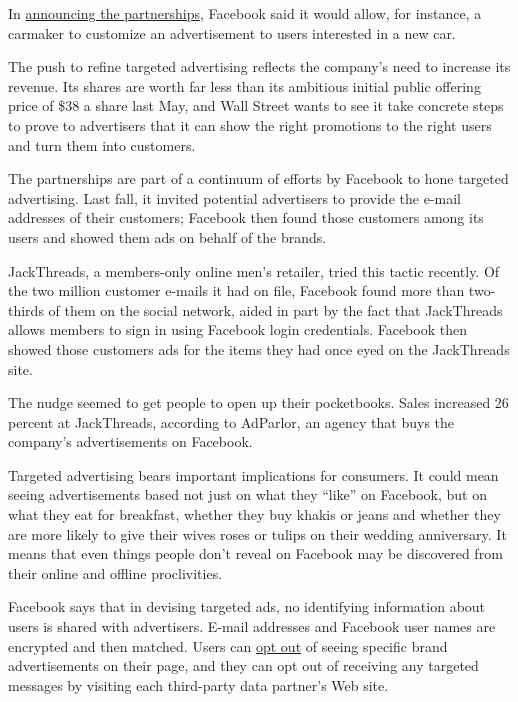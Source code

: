 In
\href{http://www.facebook-studio.com/news/item/new-ways-to-reach-the-right-audience}{announcing
the partnerships}, Facebook said it would allow, for instance, a
carmaker to customize an advertisement to users interested in a new car.

The push to refine targeted advertising reflects the company's need to
increase its revenue. Its shares are worth far less than its ambitious
initial public offering price of \$38 a share last May, and Wall Street
wants to see it take concrete steps to prove to advertisers that it can
show the right promotions to the right users and turn them into
customers.

The partnerships are part of a continuum of efforts by Facebook to hone
targeted advertising. Last fall, it invited potential advertisers to
provide the e-mail addresses of their customers; Facebook then found
those customers among its users and showed them ads on behalf of the
brands.

JackThreads, a members-only online men's retailer, tried this tactic
recently. Of the two million customer e-mails it had on file, Facebook
found more than two-thirds of them on the social network, aided in part
by the fact that JackThreads allows members to sign in using Facebook
login credentials. Facebook then showed those customers ads for the
items they had once eyed on the JackThreads site.

The nudge seemed to get people to open up their pocketbooks. Sales
increased 26 percent at JackThreads, according to AdParlor, an agency
that buys the company's advertisements on Facebook.

Targeted advertising bears important implications for consumers. It
could mean seeing advertisements based not just on what they ``like'' on
Facebook, but on what they eat for breakfast, whether they buy khakis or
jeans and whether they are more likely to give their wives roses or
tulips on their wedding anniversary. It means that even things people
don't reveal on Facebook may be discovered from their online and offline
proclivities.

Facebook says that in devising targeted ads, no identifying information
about users is shared with advertisers. E-mail addresses and Facebook
user names are encrypted and then matched. Users can
\href{https://www.facebook.com/notes/facebook-and-privacy/ad-targeting-and-your-privacy-keeping-you-informed-on-ad-targeting-updates/517330291650191)}{opt
out} of seeing specific brand advertisements on their page, and they can
opt out of receiving any targeted messages by visiting each third-party
data partner's Web site.

